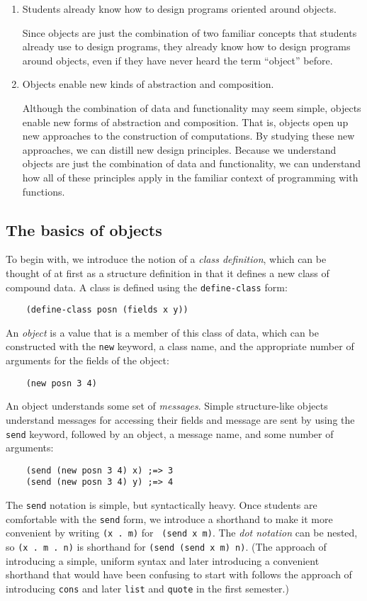 \documentclass[submission,copyright]{eptcs}
\begin{document}
\begin{enumerate}

\item Students already know how to design programs oriented around objects.

Since objects are just the combination of two familiar concepts that
students already use to design programs, they already know how to
design programs around objects, even if they have never heard the term
``object'' before.

\item Objects enable new kinds of abstraction and composition.

Although the combination of data and functionality may seem simple,
objects enable new forms of abstraction and composition. That is,
objects open up new approaches to the construction of computations. By
studying these new approaches, we can distill new design
principles. Because we understand objects are just the combination of
data and functionality, we can understand how all of these principles
apply in the familiar context of programming with functions. 
\end{enumerate}

\subsection{The basics of objects}

To begin with, we introduce the notion of a \emph{class definition},
which can be thought of at first as a structure definition in that
it defines a new class of compound data.  A class is defined using the
{\tt define-class} form:
\begin{verbatim}
    (define-class posn (fields x y))
\end{verbatim}
An \emph{object} is a value that is a member of this class of data,
which can be constructed with the {\tt new} keyword, a class name, and
the appropriate number of arguments for the fields of the object:
\begin{verbatim}
    (new posn 3 4)
\end{verbatim}
An object understands some set of \emph{messages}.  Simple
structure-like objects understand messages for accessing their fields
and message are sent by using the {\tt send} keyword, followed by an object,
a message name, and some number of arguments:
\begin{verbatim}
    (send (new posn 3 4) x) ;=> 3
    (send (new posn 3 4) y) ;=> 4
\end{verbatim}
The {\tt send} notation is simple, but syntactically heavy.  Once
students are comfortable with the {\tt send} form, we introduce a
shorthand to make it more convenient by writing {\tt (x . m)} for {\tt
  (send x m)}.  The \emph{dot notation} can be nested, so {\tt (x . m
  . n)} is shorthand for {\tt (send (send x m) n)}.  (The approach of
introducing a simple, uniform syntax and later introducing a
convenient shorthand that would have been confusing to start with
follows the approach of introducing {\tt cons} and later {\tt list}
and {\tt quote} in the first semester.)
\end{document}
